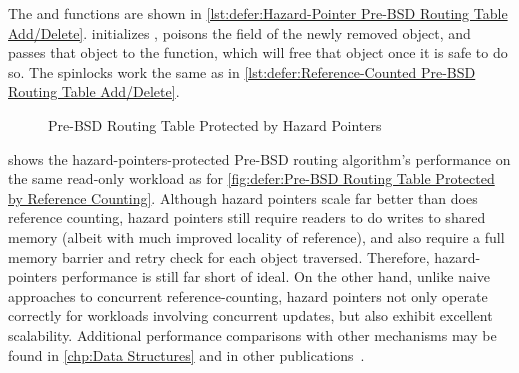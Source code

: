 \begin{fcvref}
The  and  functions are shown in
\cref{lst:defer:Hazard-Pointer Pre-BSD Routing Table Add/Delete}.
 initializes ,
 poisons the  field of the newly removed
object, and
 passes that object to the
 function, which will free that object once it
is safe to do so.
The spinlocks work the same as in
\cref{lst:defer:Reference-Counted Pre-BSD Routing Table Add/Delete}.
\end{fcvref}

\begin{figure}
\centering
{}
\caption{Pre-BSD Routing Table Protected by Hazard Pointers}
\label{fig:defer:Pre-BSD Routing Table Protected by Hazard Pointers}
\end{figure}

shows the hazard-pointers-protected Pre-BSD routing algorithm's
performance on the same read-only workload as for
\cref{fig:defer:Pre-BSD Routing Table Protected by Reference Counting}.
Although hazard pointers scale far better than does reference counting,
hazard pointers still require readers to do writes to shared
memory (albeit with much improved locality of reference),
and also require a full memory barrier and retry check for each
object traversed.
Therefore, hazard-pointers performance is still far short of ideal.
On the other hand, unlike naive approaches to concurrent
reference-counting, hazard pointers not only operate correctly for
workloads involving concurrent updates, but also exhibit excellent
scalability.
Additional performance comparisons with other mechanisms may be found in
\cref{chp:Data Structures}
and in other publications~\cite{ThomasEHart2007a,McKenney:2013:SDS:2483852.2483867,MagedMichael04a}.

